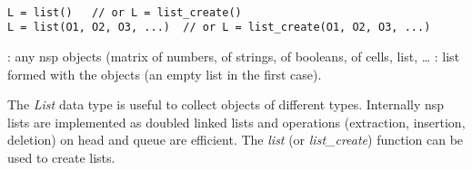
\begin{mandesc}
   \\
\end{mandesc}
\begin{calling_sequence}
\begin{verbatim}
L = list()   // or L = list_create()
L = list(O1, O2, O3, ...)  // or L = list_create(O1, O2, O3, ...)
\end{verbatim}
\end{calling_sequence}
\begin{parameters}
  \begin{varlist}
    :  any nsp objects (matrix of numbers, of
    strings, of booleans, of cells, list, \ldots
    : list formed with the objects (an empty list in the
    first case).
  \end{varlist}
\end{parameters}

\begin{mandescription}
The \emph{List} data type is useful to collect objects of different
types. Internally nsp lists are implemented as doubled linked lists
and operations (extraction, insertion, deletion) on head and queue
are efficient.  The \emph{list} (or \emph{list\_create}) function can 
be used to create lists.  
\end{mandescription}

